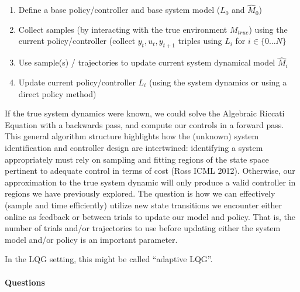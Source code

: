 {            \begin{enumerate}
            \def\labelenumi{\arabic{enumi}.}
            \setcounter{enumi}{-1}
            \tightlist
            \item
              Define a base policy/controller and base system model
              (\(L_0\) and \(\hat{M}_0\))
            \item
              Collect samples (by interacting with the true environment
              \(M_{true}\)) using the current policy/controller (collect
              \(y_t,u_t,y_{t+1}\) triples using \(L_i\) for
              \(i \in \{0\dots N\}\)
            \item
              Use sample(s) / trajectories to update current system
              dynamical model \(\hat{M}_i\)
            \item
              Update current policy/controller \(L_i\) (using the system
              dynamics or using a direct policy method)
            \end{enumerate}

            If the true system dynamics were known, we could solve the
            Algebraic Riccati Equation with a backwards pass, and
            compute our controls in a forward pass. This general
            algorithm structure highlights how the (unknown) system
            identification and controller design are intertwined:
            identifying a system appropriately must rely on sampling and
            fitting regions of the state space pertinent to adequate
            control in terms of cost (Ross ICML 2012). Otherwise, our
            approximation to the true system dynamic will only produce a
            valid controller in regions we have previously explored. The
            question is how we can effectively (sample and time
            efficiently) utilize new state transitions we encounter
            either online as feedback or between trials to update our
            model and policy. That is, the number of trials and/or
            trajectories to use before updating either the system model
            and/or policy is an important parameter.

            In the LQG setting, this might be called ``adaptive LQG''.

            \hypertarget{questions-1}{%
            \paragraph{Questions}\label{questions-1}}

}
